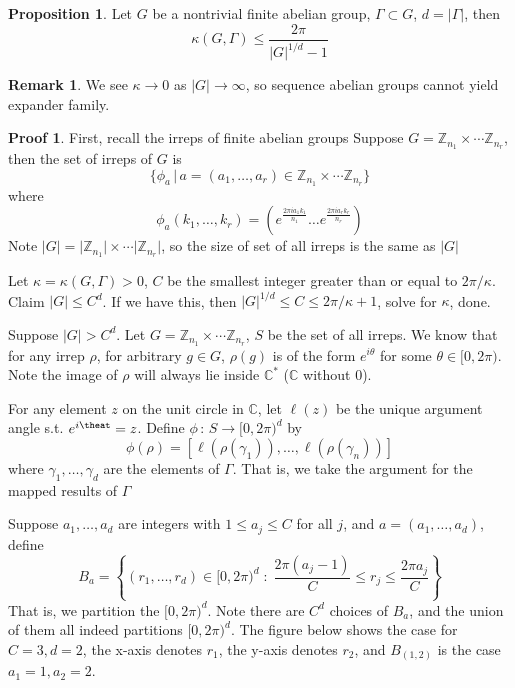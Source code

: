 \documentclass{book}
\newcommand{\Z}{\mathbb{Z}}
\newcommand{\C}{\mathbb{C}}
\newcommand{\abs}[1]{\lvert #1 \rvert }
\theoremstyle{definition}
\newtheorem{proposition}[lemma]{Proposition}
\theoremstyle{remarkstyle}
\newtheorem*{remark}{Remark}%
\newtheorem*{myproof}{Proof}%
\begin{document}
\begin{proposition}
    Let $G$ be a nontrivial finite abelian group, $\Gamma\subset G$, $d=\abs{\Gamma}$, then 
    $$
    \kappa(G,\Gamma)\le \frac{2\pi}{\abs{G}^{1/d}-1}
    $$
\end{proposition}
\begin{remark}
    We see $\kappa \rightarrow 0$ as $\abs{G}\rightarrow\infty $, so sequence abelian groups cannot yield expander family.
\end{remark}
\begin{myproof}
    First, recall the irreps of finite abelian groups \newline 
    Suppose $G=\Z_{n_1}\times \cdots \Z_{n_r} $, then the set of irreps of $G$ is
    $$
    \{\phi_a\,\lvert\, a = (a_1,\dots,a_r) \in \Z_{n_1}\times \cdots \Z_{n_r}\}
    $$
    where 
    $$
    \phi_a(k_1,\dots,k_r) = (e^{\frac{2\pi ia_1k_1}{n_1}}\dots e^{\frac{2\pi ia_rk_r}{n_r}})
    $$
    Note $\abs{G}=\abs{\Z_{n_1}}\times\cdots\abs{\Z_{n_r}}$, so the size of set of all irreps is the same as $\abs{G}$ \newline 

Let $\kappa = \kappa(G,\Gamma) >0$, $C$ be the smallest integer greater than or equal to $2\pi /\kappa$. Claim $\abs{G}\le C^d$. If we have this, then $\abs{G}^{1/d} \le C\le 2\pi/\kappa +1$, solve for $\kappa$, done. \newline 

Suppose $\abs{G}>C^d$. Let $G=\Z_{n_1}\times \cdots \Z_{n_r}$, $S$ be the set of all irreps. We know that for any irrep $\rho$, for arbitrary $g\in G$, $\rho(g)$ is of the form $e^{i\theta} $ for some $\theta \in [0,2\pi)$. Note the image of $\rho$ will always lie inside $\C^*$ ($\C$ without 0). \newline 

For any element $z$ on the unit circle in $\C$, let $\ell(z)$ be the unique argument angle s.t. $e^{i\theat} = z $. Define $\phi\,:\, S\rightarrow [0,2\pi)^d$ by 
$$
\phi(\rho) = [\ell(\rho(\gamma_1)), \dots, \ell(\rho(\gamma_n))]
$$
where $\gamma_1,\dots,\gamma_d$ are the elements of $\Gamma$. That is, we take the argument for the mapped results of $\Gamma$ \newline 

Suppose $a_1,\dots,a_d$ are integers with $1\le a_j\le C$ for all $j$, and $a=(a_1,\dots, a_d)$, define 
$$
B_a = \left\{ 
(r_1, \dots, r_d) \in [0,2\pi)^d \;:\; 
\frac{2\pi(a_j-1)}{C} \le r_j \le \frac{2\pi a_j}{C}
\right\}
$$
That is, we partition the $[0,2\pi)^d$. Note there are $C^d$ choices of $B_a$, and the union of them all indeed partitions $[0,2\pi)^d$. The figure below shows the case for $C=3, d=2$, the x-axis denotes $r_1$, the y-axis denotes $r_2$, and $B_{(1,2)} $ is the case $a_1 = 1, a_2 = 2$. \newline 


\end{myproof}
\end{document}
